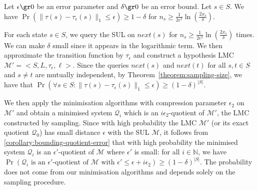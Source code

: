 \documentclass[a4paper,UKenglish,cleveref,autoref,thm-restate]{lipics-v2021}
\newcommand{\nat}{\mathbb{N}}
\newcommand{\glob}{\mathit{global}}
\newcommand{\nxt}{\mathit{next}}
\newcommand{\M}{\mathcal{M}}
\newcommand{\Hyp}{\mathcal{M}'}%
\newcommand{\tauHyp}{\tau_{\epsilon}}
\newcommand{\Q}{\mathcal{Q}}
\newcommand{\cancel}[1]{{\color{gray}#1}}
\begin{document}
\begin{theorem}\label{theorem:sampling-size} Let $\epsilon \gr 0$ be an error parameter and $\delta \gr 0$ be an error bound. Let $s \in S$. We have $\Pr(\|\tau(s) - \tauHyp(s)\|_1 \le \epsilon) \ge 1 -\delta$ for $n_s \ge \frac{1}{2 \epsilon^{2}}\ln(\frac{2x_s}{\delta})$.
\end{theorem}

For each state $s \in S$, we query the SUL on $\nxt(s)$ for $n_s \ge \frac{1}{2 \epsilon^{2}}\ln(\frac{2x_s}{\delta})$ times. We can make $\delta$ small since it appears in the logarithmic term. We then approximate the transition function by $\tauHyp$ and construct a hypothesis LMC $\Hyp = <S, L, \tauHyp, \ell>$. Since the queries $\nxt(s)$ and $\nxt(t)$ for all $s,t \in S$ and $s \not= t$ are mutually independent, by Theorem~\ref{theorem:sampling-size}, we have that $\Pr(\forall s\in S: \|\tau(s) - \tauHyp(s)\|_1 \le \epsilon) \ge (1-\delta)^{|S|} $.

We then apply the minimisation algorithms with compression parameter $\epsilon_2$ on $\Hyp$ and obtain a minimised system $\Q_{i}$ which is an $i\epsilon_2$-quotient of $\Hyp$, the LMC constructed by sampling. Since with high probability the LMC $\Hyp$ (or its exact quotient $\Q_{0}$) has small distance $\epsilon$ with the SUL $\M$, it follows from \cref{corollary:bounding-quotient-error} that with high probability the minimised system $\Q_{i}$ is an $\epsilon'$-quotient of $\M$ where $\epsilon'$ is small:  for all $i \in \nat$, we have $\Pr(\Q_i \text{ is an }\epsilon'\text{-quotient of } \M \text{ with } \epsilon' \le \epsilon + i \epsilon_2) \ge (1-\delta)^{|S|}$. The probability does not come from our minimisation algorithms and depends solely on the sampling procedure.%

\end{document}
